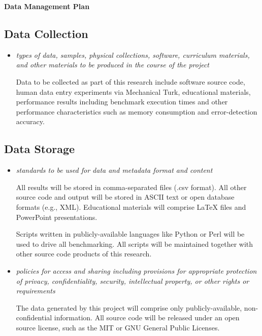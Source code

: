 \begin{center}
        {\large\bf\textsf{
            Data Management Plan}}
\end{center}


\subsection*{Data Collection}

\begin{itemize}
\item \emph{types of data, samples, physical collections, software, curriculum materials, and other materials to be produced in the course of the project}

Data to be collected as part of this research include software source
code, human data entry experiments via Mechanical Turk, educational materials, performance results
including benchmark execution times and other performance
characteristics such as memory consumption and error-detection accuracy.

\end{itemize}


\subsection*{Data Storage}

\begin{itemize}
\item \emph{standards to be used for data and metadata format and content}

All results will be stored in comma-separated files (.csv
format). All other source code and output will be stored in ASCII text
or open database formats (e.g., XML). Educational materials will
comprise LaTeX files and PowerPoint presentations.

Scripts written in publicly-available languages like Python or Perl
will be used to drive all benchmarking. All scripts will be maintained
together with other source code products of this research.

\item \emph{policies for access and sharing including provisions for appropriate protection of privacy, confidentiality, security, intellectual property, or other rights or requirements}

The data generated by this project will comprise only
publicly-available, non-confidential information. All source code will
be released under an open source license, such as the MIT or GNU General
Public Licenses.

\end{itemize}


